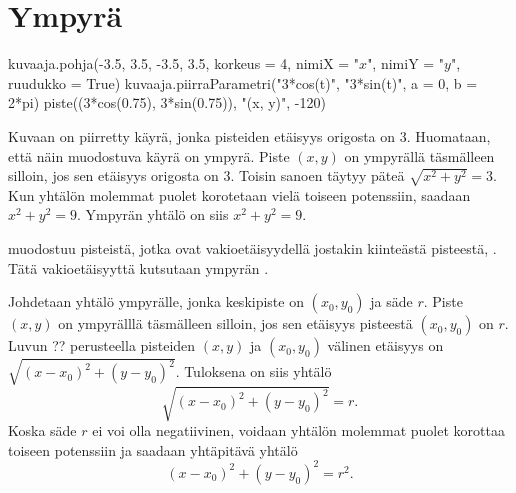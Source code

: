 \section{Ympyrä}


\begin{kuva}
    kuvaaja.pohja(-3.5, 3.5, -3.5, 3.5, korkeus = 4, nimiX = "$x$", nimiY = "$y$", ruudukko = True)
    kuvaaja.piirraParametri("3*cos(t)", "3*sin(t)", a = 0, b = 2*pi)
    piste((3*cos(0.75), 3*sin(0.75)), "(x, y)", -120)
\end{kuva}

Kuvaan on piirretty käyrä, jonka pisteiden etäisyys origosta on 3. Huomataan, että näin muodostuva käyrä on ympyrä. Piste $(x, y)$ on ympyrällä täsmälleen silloin, jos sen etäisyys origosta on 3. Toisin sanoen täytyy päteä $\sqrt{x^2+y^2}=3$. Kun yhtälön molemmat puolet korotetaan vielä toiseen potenssiin, saadaan $x^2+y^2=9$. Ympyrän yhtälö on siis $x^2+y^2=9$.

 muodostuu pisteistä, jotka ovat vakioetäisyydellä jostakin kiinteästä pisteestä, . Tätä vakioetäisyyttä kutsutaan ympyrän .

Johdetaan yhtälö ympyrälle, jonka keskipiste on $(x_0, y_0)$ ja säde $r$. Piste $(x, y)$ on ympyrälllä täsmälleen silloin, jos sen etäisyys pisteestä $(x_0, y_0)$ on $r$. Luvun ?? perusteella pisteiden $(x, y)$ ja $(x_0, y_0)$ välinen etäisyys on $\sqrt{(x-x_0)^2+(y-y_0)^2}$. Tuloksena on siis yhtälö
\[
\sqrt{(x-x_0)^2+(y-y_0)^2}=r.
\]
Koska säde $r$ ei voi olla negatiivinen, voidaan yhtälön molemmat puolet korottaa toiseen potenssiin ja saadaan yhtäpitävä yhtälö
\[
(x-x_0)^2+(y-y_0)^2=r^2.
\]




